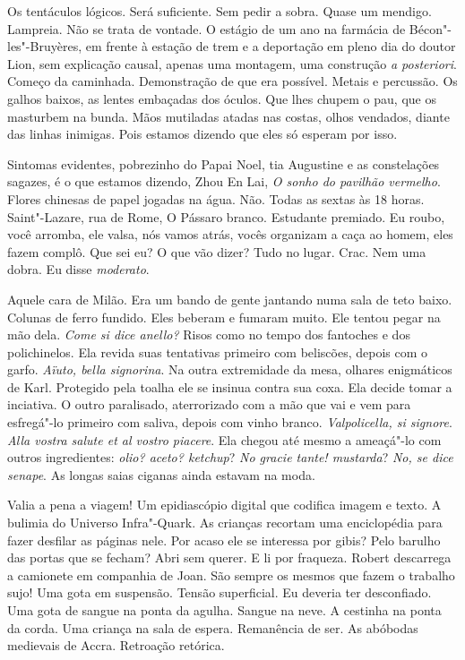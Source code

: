 Os tentáculos lógicos. Será suficiente. Sem pedir a sobra. Quase um
mendigo. Lampreia. Não se trata de vontade. O estágio de um ano na
farmácia de Bécon"-les"-Bruyères, em frente à estação de trem e a
deportação em pleno dia do doutor Lion, sem explicação causal, apenas
uma montagem, uma construção \emph{a posteriori}. Começo da caminhada.
Demonstração de que era possível. Metais e percussão. Os galhos baixos,
as lentes embaçadas dos óculos. Que lhes chupem o pau, que os masturbem
na bunda. Mãos mutiladas atadas nas costas, olhos vendados, diante das
linhas inimigas. Pois estamos dizendo que eles só esperam por isso.

Sintomas evidentes, pobrezinho do Papai Noel, tia Augustine e as
constelações sagazes, é o que estamos dizendo, Zhou En Lai, \emph{O
sonho do pavilhão vermelho}. Flores chinesas de papel jogadas na água.
Não. Todas as sextas às 18 horas. Saint"-Lazare, rua de Rome, O Pássaro
branco. Estudante premiado. Eu roubo, você arromba, ele valsa, nós vamos
atrás, vocês organizam a caça ao homem, eles fazem complô. Que sei eu? O
que vão dizer? Tudo no lugar. Crac. Nem uma dobra. Eu disse \emph{moderato}.

Aquele cara de Milão. Era um bando de gente jantando numa sala de teto
baixo. Colunas de ferro fundido. Eles beberam e fumaram muito. Ele
tentou pegar na mão dela. \emph{Come si dice anello?} Risos como no
tempo dos fantoches e dos polichinelos. Ela revida suas tentativas
primeiro com beliscões, depois com o garfo. \emph{Aïuto, bella
signorina}. Na outra extremidade da mesa, olhares enigmáticos de Karl.
Protegido pela toalha ele se insinua contra sua coxa. Ela decide tomar a
inciativa. O outro paralisado, aterrorizado com a mão que vai e vem para
esfregá"-lo primeiro com saliva, depois com vinho branco.
\emph{Valpolicella, si signore}. \emph{Alla vostra salute et al vostro
piacere}. Ela chegou até mesmo a ameaçá"-lo com outros ingredientes:
\emph{olio? aceto? ketchup}? \emph{No gracie tante! mustarda}? \emph{No,
se dice senape}. As longas saias ciganas ainda estavam na moda.

Valia a pena a viagem! Um epidiascópio digital que codifica imagem e
texto. A bulimia do Universo Infra"-Quark. As crianças recortam uma
enciclopédia para fazer desfilar as páginas nele. Por acaso ele se
interessa por gibis? Pelo barulho das portas que se fecham? Abri sem
querer. E li por fraqueza. Robert descarrega a camionete em companhia de
Joan. São sempre os mesmos que fazem o trabalho sujo! Uma gota em
suspensão. Tensão superficial. Eu deveria ter desconfiado. Uma gota de
sangue na ponta da agulha. Sangue na neve. A cestinha na ponta da corda.
Uma criança na sala de espera. Remanência de ser. As abóbodas medievais
de Accra. Retroação retórica.

